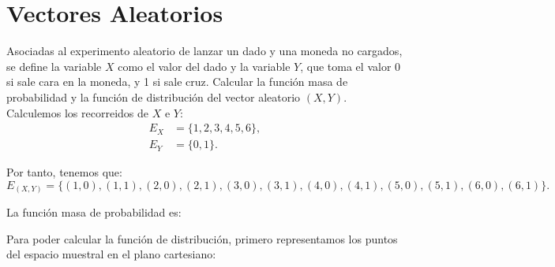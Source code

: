 \section{Vectores Aleatorios}

\begin{ejercicio}
    Asociadas al experimento aleatorio de lanzar un dado y una moneda no cargados, se define la variable $X$ como el valor del dado y la variable $Y$, que toma el valor 0 si sale cara en la moneda, y 1 si sale cruz. Calcular la función masa de probabilidad y la función de distribución del vector aleatorio $(X,Y)$.\\

    Calculemos los recorreidos de $X$ e $Y$:
    \begin{align*}
        E_X &= \{1, 2, 3, 4, 5, 6\}, \\
        E_Y &= \{0, 1\}.
    \end{align*}

    Por tanto, tenemos que:
    \begin{equation*}
        E_{(X,Y)} = \{(1,0), (1,1), (2,0), (2,1), (3,0), (3,1), (4,0), (4,1), (5,0), (5,1), (6,0), (6,1)\}.
    \end{equation*}

    La función masa de probabilidad es:

    Para poder calcular la función de distribución, primero representamos los puntos del espacio muestral en el plano cartesiano:
    \begin{figure}[H]
        \centering
    \end{figure}


\end{ejercicio}
